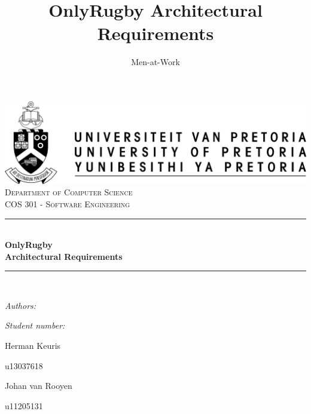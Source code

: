 \documentclass[hidelinks,a4paper,12pt]{article}
\author{Men-at-Work}
\title{ OnlyRugby Architectural Requirements}
\newcommand{\HRule}{\rule{\linewidth}{0.5mm}}
\begin{document}
\setlength{\parskip}{6pt}

\begin{titlepage}

\begin{center}
\includegraphics[width=1\textwidth]{./up-logo.jpg}\\[0.4cm]    
\textsc{\LARGE Department of Computer Science}\\[1.5cm]
\textsc{\Large COS 301 - Software Engineering}\\[0.5cm]
\HRule \\[0.4cm]
{ \huge \bfseries OnlyRugby\\Architectural Requirements}\\[0.4cm]
\HRule \\[0.4cm]
\begin{minipage}{0.4\textwidth}
\begin{flushleft} \large
\emph{Authors:}
\end{flushleft}
\end{minipage}
\begin{minipage}{0.4\textwidth}
\begin{flushright} \large
\emph{Student number:}
\end{flushright}
\end{minipage}

\begin{minipage}{0.4\textwidth}
\begin{flushleft} \large
Herman {Keuris}
\end{flushleft}
\end{minipage}
\begin{minipage}{0.4\textwidth}
\begin{flushright} \large
\emph{}
u13037618
\end{flushright}
\end{minipage}

\begin{minipage}{0.4\textwidth}
\begin{flushleft} \large
Johan {van Rooyen}
\end{flushleft}
\end{minipage}
\begin{minipage}{0.4\textwidth}
\begin{flushright} \large
\emph{}
u11205131
\end{flushright}
\end{minipage}


\end{center}
\end{titlepage}
\end{document}
